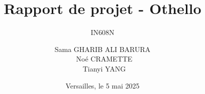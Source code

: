 \documentclass{beamer}
\title{Rapport de projet - Othello}
\subtitle{IN608N}
\author{Sama GHARIB ALI BARURA \\
\ Noé CRAMETTE \\
\ Tianyi YANG}
\institute
{
    Université de Versailles Saint-Quentin \\
    Licence d'informatique %
}
\date{Versailles, le 5 mai 2025} %
\begin{document}
	\begin{frame}
		\titlepage
	\end{frame}

	
	
	
\end{document}
